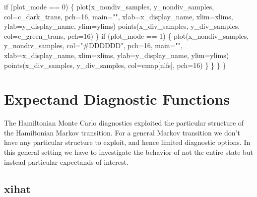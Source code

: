 \documentclass[
  letterpaper,
  DIV=11,
  numbers=noendperiod]{scrartcl}
\newenvironment{Shaded}{\begin{snugshade}}{\end{snugshade}}
\newcommand{\AttributeTok}[1]{\textcolor[rgb]{0.40,0.45,0.13}{#1}}
\newcommand{\ControlFlowTok}[1]{\textcolor[rgb]{0.00,0.23,0.31}{#1}}
\newcommand{\DecValTok}[1]{\textcolor[rgb]{0.68,0.00,0.00}{#1}}
\newcommand{\FunctionTok}[1]{\textcolor[rgb]{0.28,0.35,0.67}{#1}}
\newcommand{\NormalTok}[1]{\textcolor[rgb]{0.00,0.23,0.31}{#1}}
\newcommand{\SpecialCharTok}[1]{\textcolor[rgb]{0.37,0.37,0.37}{#1}}
\newcommand{\StringTok}[1]{\textcolor[rgb]{0.13,0.47,0.30}{#1}}
\begin{document}
\begin{Shaded}
\begin{Highlighting}[]
      \ControlFlowTok{if}\NormalTok{ (plot\_mode }\SpecialCharTok{==} \DecValTok{0}\NormalTok{) \{}
        \FunctionTok{plot}\NormalTok{(x\_nondiv\_samples, y\_nondiv\_samples,}
             \AttributeTok{col=}\NormalTok{c\_dark\_trans, }\AttributeTok{pch=}\DecValTok{16}\NormalTok{, }\AttributeTok{main=}\StringTok{""}\NormalTok{,}
             \AttributeTok{xlab=}\NormalTok{x\_display\_name, }\AttributeTok{xlim=}\NormalTok{xlims, }
             \AttributeTok{ylab=}\NormalTok{y\_display\_name, }\AttributeTok{ylim=}\NormalTok{ylims)}
        \FunctionTok{points}\NormalTok{(x\_div\_samples, y\_div\_samples,}
               \AttributeTok{col=}\NormalTok{c\_green\_trans, }\AttributeTok{pch=}\DecValTok{16}\NormalTok{)}
\NormalTok{      \}}
      \ControlFlowTok{if}\NormalTok{ (plot\_mode }\SpecialCharTok{==} \DecValTok{1}\NormalTok{) \{}
        \FunctionTok{plot}\NormalTok{(x\_nondiv\_samples, y\_nondiv\_samples,}
             \AttributeTok{col=}\StringTok{"\#DDDDDD"}\NormalTok{, }\AttributeTok{pch=}\DecValTok{16}\NormalTok{, }\AttributeTok{main=}\StringTok{""}\NormalTok{,}
             \AttributeTok{xlab=}\NormalTok{x\_display\_name, }\AttributeTok{xlim=}\NormalTok{xlims, }
             \AttributeTok{ylab=}\NormalTok{y\_display\_name, }\AttributeTok{ylim=}\NormalTok{ylims)}
        \FunctionTok{points}\NormalTok{(x\_div\_samples, y\_div\_samples,}
               \AttributeTok{col=}\NormalTok{cmap[nlfs], }\AttributeTok{pch=}\DecValTok{16}\NormalTok{)}
\NormalTok{      \}}
\NormalTok{    \}}
\NormalTok{  \}}
\NormalTok{\}}
\end{Highlighting}
\end{Shaded}

\hypertarget{expectand-diagnostic-functions}{%
\section{Expectand Diagnostic
Functions}\label{expectand-diagnostic-functions}}

The Hamiltonian Monte Carlo diagnostics exploited the particular
structure of the Hamiltonian Markov transition. For a general Markov
transition we don't have any particular structure to exploit, and hence
limited diagnostic options. In this general setting we have to
investigate the behavior of not the entire state but instead particular
expectands of interest.

\hypertarget{xihat}{%
\subsection{xihat}\label{xihat}}
\end{document}
